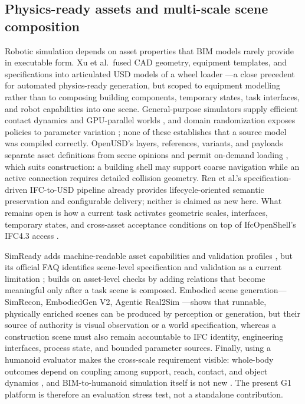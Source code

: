 \subsection{Physics-ready assets and multi-scale scene composition}

Robotic simulation depends on asset properties that BIM models rarely
provide in executable form. Xu et al.\ fused CAD geometry, equipment
templates, and specifications into articulated USD models of a wheel loader
\cite{xu2024physics}---a close precedent for automated physics-ready
generation, but scoped to equipment modelling rather than to composing
building components, temporary states, task interfaces, and robot
capabilities into one scene. General-purpose simulators supply efficient
contact dynamics and GPU-parallel worlds
\cite{todorov2012mujoco,makoviychuk2021isaacgym}, and domain randomization
exposes policies to parameter variation \cite{tobin2017domain}; none of
these establishes that a source model was compiled correctly. OpenUSD's
layers, references, variants, and payloads separate asset definitions from
scene opinions and permit on-demand loading \cite{openUSD}, which suits
construction: a building shell may support coarse navigation while an active
connection requires detailed collision geometry. Ren et al.'s
specification-driven IFC-to-USD pipeline \cite{ren2025ifcusd} already
provides lifecycle-oriented semantic preservation and configurable delivery;
neither is claimed as new here. What remains open is how a current task
activates geometric scales, interfaces, temporary states, and cross-asset
acceptance conditions on top of IfcOpenShell's IFC4.3 access
\cite{ifc43,ifcopenshellDocs}.

SimReady adds machine-readable asset capabilities and validation profiles
\cite{nvidiaSimReadyWorkflow}, but its official FAQ identifies scene-level
specification and validation as a current limitation
\cite{nvidiaSimReadyFAQ}; \systemname{} builds on asset-level checks by adding
relations that become meaningful only after a task scene is composed.
Embodied scene generation---SimRecon, EmbodiedGen V2, Agentic Real2Sim
\cite{xia2026simrecon,wang2026embodiedgenv2,chen2026agenticreal2sim}---shows
that runnable, physically enriched scenes can be produced by perception or
generation, but their source of authority is visual observation or a world
specification, whereas a construction scene must also remain accountable to
IFC identity, engineering interfaces, process state, and bounded parameter
sources. Finally, using a humanoid evaluator makes the cross-scale
requirement visible: whole-body outcomes depend on coupling among support,
reach, contact, and object dynamics \cite{sferrazza2024humanoidbench}, and
BIM-to-humanoid simulation itself is not new \cite{ye2026humanoiddt}. The
present G1 platform is therefore an evaluation stress test, not a standalone
contribution.

